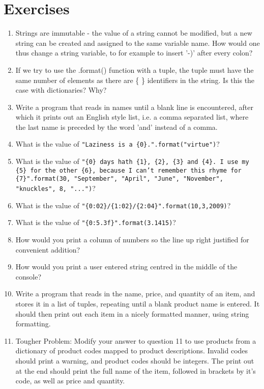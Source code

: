 \section{Exercises}
\begin{enumerate}
	\item Strings are immutable - the value of a string                         cannot be modified, but a new string can be created and                         assigned to the same variable name.  How would one thus                         change a string variable, to for example to insert '-)'                         after every colon?
	\item If we try to use the .format() function with a                         tuple, the tuple must have the same number of elements                         as there are \{ \} identifiers in the string. Is this the                         case with dictionaries?  Why?
	\item Write a program that reads in names until a blank                         line is encountered, after which it prints out an                         English style list, i.e. a comma separated list, where                         the last name is preceded by the word 'and' instead of                         a comma.
	\item What is the value of 
\texttt{"Laziness is a    \{0\}.".format("virtue")}?
	\item What is the value of 
\texttt{"\{0\} days hath \{1\}, \{2\}, \{3\} and \{4\}. I    use my \{5\} for the other \{6\}, because I can't remember this rhyme for    \{7\}".format(30, "September", "April", "June", "November", "knuckles", 8,    "...")}?
	\item What is the value of    
\texttt{"\{0:02\}/\{1:02\}/\{2:04\}".format(10,3,2009)}?
	\item What is the value of 
\texttt{"\{0:5.3f\}".format(3.1415)}?
	\item How would you print a column of numbers so the line up right    justified for convenient addition?
	\item How would you print a user entered string centred in the    middle of the console?
	\item Write a program that reads in the name, price, and quantity of    an item, and stores it in a list of tuples, repeating until a blank    product name is entered. It should then print out each item in a    nicely formatted manner, using string formatting.
	\item Tougher Problem: Modify your answer to question 11                         to use products from a dictionary of product codes                         mapped to product descriptions. Invalid codes should                         print a warning, and product codes should be integers.                         The print out at the end should print the full name of                         the item, followed in brackets by it's code, as well as                         price and quantity.
\end{enumerate} 
